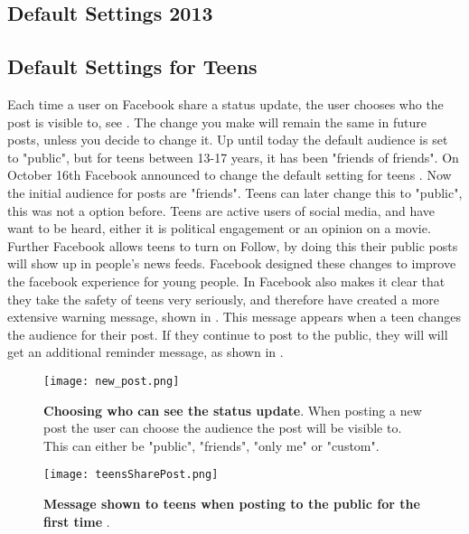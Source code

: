 \subsection{Default Settings 2013}


\subsection{Default Settings for Teens}
Each time a user on Facebook share a status update, the user chooses who the post is visible to, see . The change you make will remain the same in future posts, unless you decide to change it. Up until today the default audience is set to "public", but for teens between 13-17 years, it has been "friends of friends". On October 16th Facebook announced to change the default setting for teens \cite{defaultTeens}. Now the initial audience for posts are "friends". Teens can later change this to "public", this was not a option before. Teens are active users of social media, and have want to be heard, either it is political engagement or an opinion on a movie. Further Facebook allows teens to turn on Follow, by doing this their public posts will show up in people's news feeds. Facebook designed these changes to improve the facebook experience for young people. In \cite{defaultTeens} Facebook also makes it clear that they take the safety of teens very seriously, and therefore have created a more extensive warning message, shown in  . This message appears when a teen changes the audience for their post. If they continue to post to the public, they will will get an additional reminder message, as shown in  .

\begin{figure}[h!]
\centering
\texttt{[image: new\_post.png]}
\caption[Choosing who can see the status update.]{\textbf{Choosing who can see the status update}. When posting a new post the user can choose the audience the post will be visible to. This can either be "public", "friends", "only me" or "custom".} 
\label{fig:newPost}
\end{figure}

\begin{figure}[h!]
\centering
\texttt{[image: teensSharePost.png]}
\caption[Message shown to teens when posting to the public for the first time.]{\textbf{Message shown to teens when posting to the public for the first time} \cite{defaultTeens}.} 
\label{fig:teensSharePost}
\end{figure}

